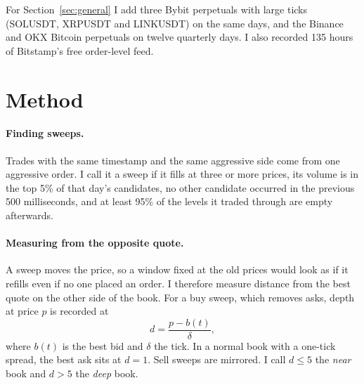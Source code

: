 \documentclass[12pt]{article}
\newcommand{\tabnote}[1]{\par\vspace{2pt}{\footnotesize\singlespacing\noindent #1\par}\vspace{6pt}}
\begin{document}
For Section~\ref{sec:general} I add three Bybit perpetuals with large ticks (SOLUSDT, XRPUSDT
and LINKUSDT) on the same days, and the Binance and OKX Bitcoin perpetuals on twelve quarterly
days. I also recorded 135 hours of Bitstamp's free order-level feed.

\begin{table}[ht]
\centering
\caption{Sample}
\tabnote{Sweeps: aggressive orders clearing at least three levels, with volume at or above
the day's 95th percentile and no other candidate within the preceding 500\,ms. Clean sweeps: at
least 95\% of the swept levels are empty at the first book message after the sweep.}
\label{tab:sample}

\end{table}

\section{Method}
\label{sec:method}

\paragraph{Finding sweeps.} Trades with the same timestamp and the same aggressive side come from
one aggressive order. I call it a sweep if it fills at three or more prices, its volume is in the
top 5\% of that day's candidates, no other candidate occurred in the previous 500 milliseconds,
and at least 95\% of the levels it traded through are empty afterwards.

\paragraph{Measuring from the opposite quote.} A sweep moves the price, so a window fixed at the
old prices would look as if it refills even if no one placed an order. I therefore measure
distance from the best quote on the other side of the book. For a buy sweep, which removes
asks, depth at price $p$ is recorded at
\begin{equation}
  d = \frac{p - b(t)}{\delta},
\end{equation}
where $b(t)$ is the best bid and $\delta$ the tick. In a normal book with a one-tick spread, the
best ask sits at $d=1$. Sell sweeps are mirrored. I call $d \le 5$ the \emph{near} book and
$d > 5$ the \emph{deep} book.
\end{document}
